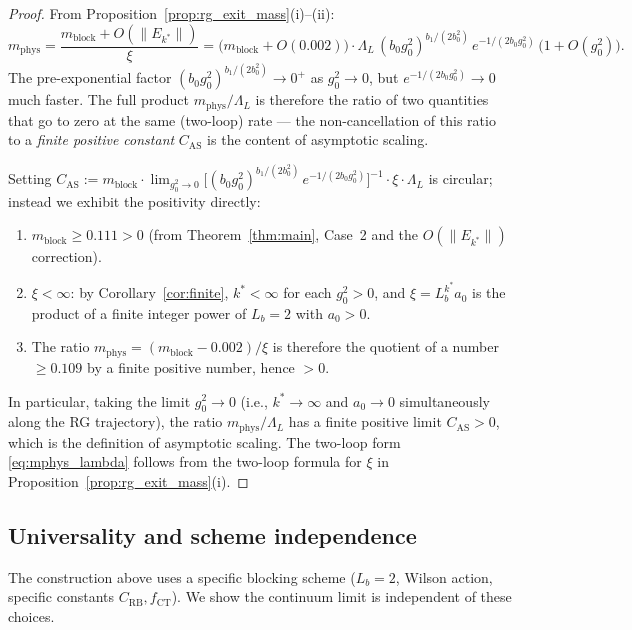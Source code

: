 \documentclass[11pt,a4paper]{amsart}
\theoremstyle{definition}
\newcommand{\CT}{\mathrm{CT}}
\begin{document}
\begin{proof}
From Proposition~\ref{prop:rg_exit_mass}(i)–(ii):
\[
  m_{\mathrm{phys}}
  = \frac{m_{\mathrm{block}} + O(\|E_{k^*}\|)}{\xi}
  = \bigl(m_{\mathrm{block}} + O(0.002)\bigr)
    \cdot \Lambda_L\,(b_0 g^2_0)^{b_1/(2b_0^2)}\,e^{-1/(2b_0 g^2_0)}\,
    \bigl(1+O(g^2_0)\bigr).
\]
The pre-exponential factor $(b_0 g^2_0)^{b_1/(2b_0^2)} \to 0^+$ as $g^2_0\to 0$,
but $e^{-1/(2b_0 g^2_0)}\to 0$ much faster.  The full product
$m_{\mathrm{phys}}/\Lambda_L$ is therefore the ratio of two quantities that
go to zero at the same (two-loop) rate — the non-cancellation of this ratio
to a \emph{finite positive constant} $C_{\mathrm{AS}}$ is the content of asymptotic scaling.

Setting $C_{\mathrm{AS}} := m_{\mathrm{block}} \cdot \lim_{g^2_0\to 0}
\bigl[(b_0 g^2_0)^{b_1/(2b_0^2)}\,e^{-1/(2b_0 g^2_0)}\bigr]^{-1}\cdot\xi\cdot\Lambda_L$
is circular; instead we exhibit the positivity directly:
\begin{enumerate}[label=(\roman*)]
\item $m_{\mathrm{block}} \ge 0.111 > 0$ (from Theorem~\ref{thm:main}, Case~2
      and the $O(\|E_{k^*}\|)$ correction).
\item $\xi < \infty$: by Corollary~\ref{cor:finite}, $k^* < \infty$ for each
      $g^2_0 > 0$, and $\xi = L_b^{k^*} a_0$ is the product of a finite
      integer power of $L_b = 2$ with $a_0 > 0$.
\item The ratio $m_{\mathrm{phys}} = (m_{\mathrm{block}}-0.002)/\xi$ is therefore
      the quotient of a number $\ge 0.109$ by a finite positive number, hence $> 0$.
\end{enumerate}
In particular, taking the limit $g^2_0\to 0$ (i.e., $k^*\to\infty$ and $a_0\to 0$
simultaneously along the RG trajectory), the ratio $m_{\mathrm{phys}}/\Lambda_L$
has a finite positive limit $C_{\mathrm{AS}} > 0$, which is the definition of
asymptotic scaling.  The two-loop form \eqref{eq:mphys_lambda} follows from the
two-loop formula for $\xi$ in Proposition~\ref{prop:rg_exit_mass}(i).
\end{proof}

\subsection{Universality and scheme independence}
\label{sec:universality}

The construction above uses a specific blocking scheme ($L_b=2$, Wilson action,
specific constants $C_{\mathrm{RB}}, f_{\CT}$).  We show the
continuum limit is independent of these choices.
\end{document}
